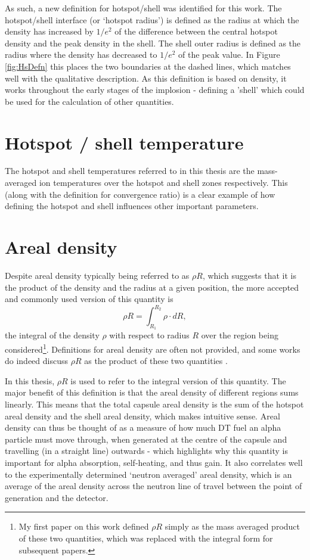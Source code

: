 As such, a new definition for hotspot/shell was identified for this work. The hotspot/shell interface (or `hotspot radius') is defined as the radius at which the density has increased by $1/e^2$ of the difference between the central hotspot density and the peak density in the shell. The shell outer radius is defined as the radius where the density has decreased to $1/e^2$ of the peak value. In Figure \ref{fig:HsDefn} this places the two boundaries at the dashed lines, which matches well with the qualitative description. As this definition is based on density, it works throughout the early stages of the implosion - defining a 'shell' which could be used for the calculation of other quantities. 

\section{Hotspot / shell temperature}
The hotspot and shell temperatures referred to in this thesis are the mass-averaged ion temperatures over the hotspot and shell zones respectively. This (along with the definition for convergence ratio) is a clear example of how defining the hotspot and shell influences other important parameters.

\section{Areal density}

Despite areal density typically being referred to as $\rho R$, which suggests that it is the product of the density and the radius at a given position, the more accepted and commonly used version \cite{Craxton2005, Betti2005, Abu-Shawareb2022} of this quantity is \begin{equation} \rho R = \int_{R_1}^{R_2} \rho \cdot dR, \end{equation} the integral of the density $\rho$ with respect to radius $R$ over the region being considered\footnote{My first paper on this work defined $\rho R$ simply as the mass averaged product of these two quantities, which was replaced with the integral form for subsequent papers.}. Definitions for areal density are often not provided, and some works do indeed discuss $\rho R$ as the product of these two quantities \cite{Atzeni2008}.

In this thesis, $\rho R$ is used to refer to the integral version of this quantity. The major benefit of this definition is that the areal density of different regions sums linearly. This means that the total capsule areal density is the sum of the hotspot areal density and the shell areal density, which makes intuitive sense. Areal density can thus be thought of as a measure of how much DT fuel an alpha particle must move through, when generated at the centre of the capsule and travelling (in a straight line) outwards - which highlights why this quantity is important for alpha absorption, self-heating, and thus gain. It also correlates well to the experimentally determined `neutron averaged' areal density, which is an average of the areal density across the neutron line of travel between the point of generation and the detector.


